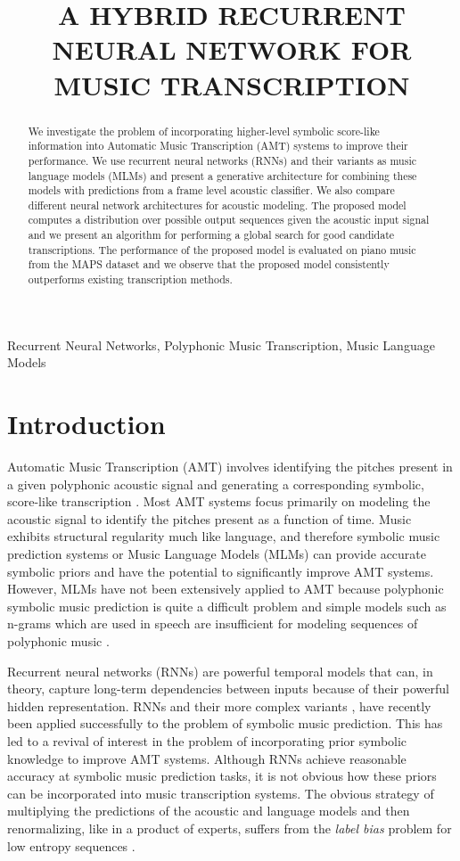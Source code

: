 \documentclass{article}
\title{A HYBRID RECURRENT NEURAL NETWORK FOR MUSIC TRANSCRIPTION}
\begin{document}
\ninept
%
\maketitle
%
\begin{abstract}
We investigate the problem of incorporating higher-level symbolic score-like information into Automatic Music Transcription (AMT) systems to improve their performance. We use recurrent neural networks (RNNs) and their variants as music language models (MLMs) and present a generative architecture for combining these models with predictions from a frame level acoustic classifier. We also compare different neural network architectures for acoustic modeling. The proposed model computes a distribution over possible output sequences given the acoustic input signal and we present an algorithm for performing a global search for good candidate transcriptions. The performance of the proposed model is evaluated on piano music from the MAPS dataset and we observe that the proposed model consistently outperforms existing transcription methods. 
\end{abstract}
%
\begin{keywords}
Recurrent Neural Networks, Polyphonic Music Transcription, Music Language Models
\end{keywords}
%
\section{Introduction}
\label{sec:intro} 

Automatic Music Transcription (AMT) involves identifying the pitches present in a given polyphonic acoustic signal and generating a corresponding symbolic, score-like transcription \cite{Klapuri06book}. Most AMT systems focus primarily on modeling the acoustic signal to identify the pitches present as a function of time. Music exhibits structural regularity much like language, and therefore symbolic music prediction systems or Music Language Models (MLMs) can provide accurate symbolic priors and have the potential to significantly improve AMT systems. However, MLMs have not been extensively applied to AMT because polyphonic symbolic music prediction is quite a difficult problem and simple models such as n-grams which are used in speech are insufficient for modeling sequences of polyphonic music \cite{boulanger2012modeling}. 

Recurrent neural networks (RNNs) are powerful temporal models that can, in theory, capture long-term dependencies between inputs because of their powerful hidden representation. RNNs and their more complex variants \cite{boulanger2012modeling}, have recently been applied successfully to the problem of symbolic music prediction. This has led to a revival of interest in the problem of incorporating prior symbolic knowledge to improve AMT systems. Although RNNs achieve reasonable accuracy at symbolic music prediction tasks, it is not obvious how these priors can be incorporated into music transcription systems. The obvious strategy of multiplying the predictions of the acoustic and language models and then renormalizing, like in a product of experts, suffers from the \emph{label bias} problem for low entropy sequences \cite{Lafferty:2001:CRF:645530.655813}. 
\end{document}
